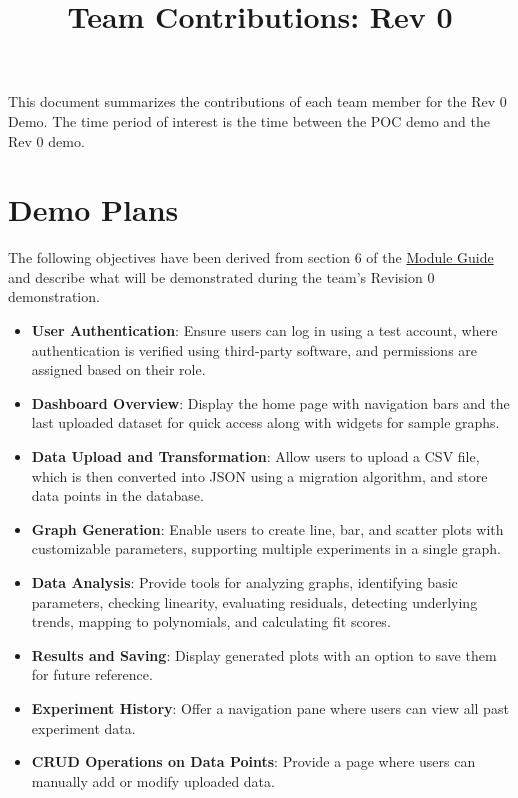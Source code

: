 \documentclass{article}
\title{Team Contributions: Rev 0\\\progname}
\author{\authname}
\date{}
\begin{document}
\maketitle

This document summarizes the contributions of each team member for the Rev 0
Demo.  The time period of interest is the time between the POC demo and the Rev
0 demo.

\section{Demo Plans}
The following objectives have been derived from section 6 of the \href{https://github.com/SumanyaG/Alkalytics/blob/main/docs/Design/MG.pdf}{Module Guide} 
and describe what will be demonstrated during the team’s Revision 0 demonstration.

\begin{itemize}
    \item \textbf{User Authentication}: Ensure users can log in using a test account,
    where authentication is verified using third-party software, and permissions are
    assigned based on their role.
    \item \textbf{Dashboard Overview}: Display the home page with navigation bars and
    the last uploaded dataset for quick access along with widgets for sample graphs.
    \item \textbf{Data Upload and Transformation}: Allow users to upload a CSV file,
    which is then converted into JSON using a migration algorithm, and store data
    points in the database.
    \item \textbf{Graph Generation}: Enable users to create line, bar, and scatter
    plots with customizable parameters, supporting multiple experiments in a single graph.
    \item \textbf{Data Analysis}: Provide tools for analyzing graphs, identifying basic
    parameters, checking linearity, evaluating residuals, detecting underlying trends,
    mapping to polynomials, and calculating fit scores.
    \item \textbf{Results and Saving}: Display generated plots with an option to save
    them for future reference.
    \item \textbf{Experiment History}: Offer a navigation pane where users can view
    all past experiment data.
    \item \textbf{CRUD Operations on Data Points}: Provide a page where users can
    manually add or modify uploaded data.
\end{itemize}
\end{document}
